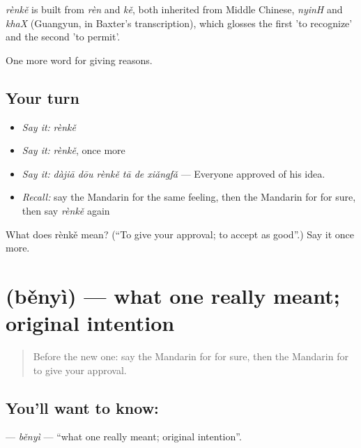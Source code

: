 \begin{cousinweb}
\emph{rènkě} is built from \emph{rèn} and \emph{kě}, both inherited from Middle Chinese, \emph{nyinH} and \emph{khaX} (Guangyun, in Baxter's transcription), which glosses the first 'to recognize' and the second 'to permit'.
\end{cousinweb}

\begin{grammarlens}[title={What you've built}]
One more word for giving reasons.
\end{grammarlens}

\subsection*{Your turn}
\begin{itemize}
\raggedright
  \item \emph{Say it:} \emph{rènkě}
  \item \emph{Say it:} \emph{rènkě}, once more
  \item \emph{Say it:} \emph{dàjiā dōu rènkě tā de xiǎngfǎ} — Everyone approved of his idea.
  \item \emph{Recall:} say the Mandarin for the same feeling, then the Mandarin for for sure, then say \emph{rènkě} again
\end{itemize}

\begin{tcolorbox}[breakable,colback=teal!4,colframe=teal!35!black,title={Before you move on}]
What does rènkě mean? (\textquotedblleft{}To give your approval; to accept as good\textquotedblright{}.) Say it once more.
\end{tcolorbox}
\section[\texorpdfstring{\zh{本意} (běnyì)}{本意 (běnyì)}]{ (běnyì) — what one really meant; original intention}

\label{lesson:ZH-C352-benyi}



\begin{quote}
Before the new one: say the Mandarin for for sure, then the Mandarin for to give your approval.
\end{quote}

\subsection*{You'll want to know: }
\textbf{} — \emph{běnyì} — \textquotedblleft{}what one really meant; original intention\textquotedblright{}.

